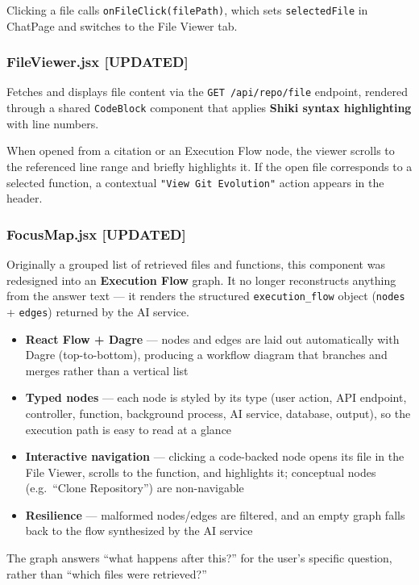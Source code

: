 \documentclass[a4paper,11pt]{article}
\begin{document}
Clicking a file calls \texttt{onFileClick(filePath)}, which sets \texttt{selectedFile} in ChatPage and switches to the File Viewer tab.

\subsubsection{FileViewer.jsx \textbf{[UPDATED]}}
Fetches and displays file content via the \texttt{GET /api/repo/file} endpoint, rendered through a shared \texttt{CodeBlock} component that applies \textbf{Shiki syntax highlighting} with line numbers.

When opened from a citation or an Execution Flow node, the viewer scrolls to the referenced line range and briefly highlights it. If the open file corresponds to a selected function, a contextual \texttt{"View Git Evolution"} action appears in the header.

\subsubsection{FocusMap.jsx \textbf{[UPDATED]}}
Originally a grouped list of retrieved files and functions, this component was redesigned into an \textbf{Execution Flow} graph. It no longer reconstructs anything from the answer text --- it renders the structured \texttt{execution\_flow} object (\texttt{nodes} + \texttt{edges}) returned by the AI service.

\begin{itemize}
    \item \textbf{React Flow + Dagre} --- nodes and edges are laid out automatically with Dagre (top-to-bottom), producing a workflow diagram that branches and merges rather than a vertical list
    \item \textbf{Typed nodes} --- each node is styled by its type (user action, API endpoint, controller, function, background process, AI service, database, output), so the execution path is easy to read at a glance
    \item \textbf{Interactive navigation} --- clicking a code-backed node opens its file in the File Viewer, scrolls to the function, and highlights it; conceptual nodes (e.g.\ ``Clone Repository'') are non-navigable
    \item \textbf{Resilience} --- malformed nodes/edges are filtered, and an empty graph falls back to the flow synthesized by the AI service
\end{itemize}

The graph answers ``what happens after this?'' for the user's specific question, rather than ``which files were retrieved?''
\end{document}
